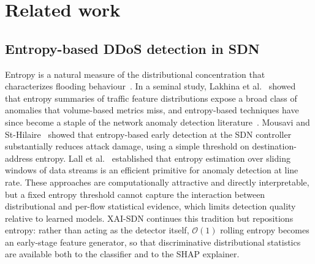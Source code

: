 ﻿\documentclass[review,12pt]{elsarticle}
\begin{document}
\section{Related work}
\label{sec:related}

\subsection{Entropy-based DDoS detection in SDN}
Entropy is a natural measure of the distributional concentration that characterizes flooding behaviour~\cite{nychis2008entropy}. In a seminal study, Lakhina et al.~\cite{lakhina2005mining} showed that entropy summaries of traffic feature distributions expose a broad class of anomalies that volume-based metrics miss, and entropy-based techniques have since become a staple of the network anomaly detection literature~\cite{bhuyan2014network}. Mousavi and St-Hilaire~\cite{mousavi2015early} showed that entropy-based early detection at the SDN controller substantially reduces attack damage, using a simple threshold on destination-address entropy. Lall et al.~\cite{lall2006entropy} established that entropy estimation over sliding windows of data streams is an efficient primitive for anomaly detection at line rate. These approaches are computationally attractive and directly interpretable, but a fixed entropy threshold cannot capture the interaction between distributional and per-flow statistical evidence, which limits detection quality relative to learned models. XAI-SDN continues this tradition but repositions entropy: rather than acting as the detector itself, $\mathcal{O}(1)$ rolling entropy becomes an early-stage feature generator, so that discriminative distributional statistics are available both to the classifier and to the SHAP explainer.
\end{document}
